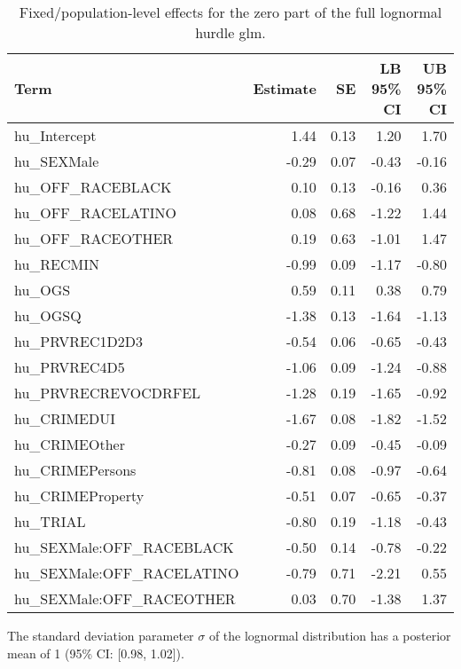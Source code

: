 \documentclass[
  letterpaper,
  DIV=11,
  numbers=noendperiod]{scrartcl}
\begin{document}
\hypertarget{tbl-brms-hurdle-model-summary-2-zero}{}
\begin{table}
\caption{\label{tbl-brms-hurdle-model-summary-2-zero}Fixed/population-level effects for the zero part of the full lognormal
hurdle glm. }\tabularnewline

\centering
\begin{tabular}{l|r|r|r|r}
\hline
Term & Estimate & SE & LB 95\% CI & UB 95\% CI\\
\hline
hu\_Intercept & 1.44 & 0.13 & 1.20 & 1.70\\
\hline
hu\_SEXMale & -0.29 & 0.07 & -0.43 & -0.16\\
\hline
hu\_OFF\_RACEBLACK & 0.10 & 0.13 & -0.16 & 0.36\\
\hline
hu\_OFF\_RACELATINO & 0.08 & 0.68 & -1.22 & 1.44\\
\hline
hu\_OFF\_RACEOTHER & 0.19 & 0.63 & -1.01 & 1.47\\
\hline
hu\_RECMIN & -0.99 & 0.09 & -1.17 & -0.80\\
\hline
hu\_OGS & 0.59 & 0.11 & 0.38 & 0.79\\
\hline
hu\_OGSQ & -1.38 & 0.13 & -1.64 & -1.13\\
\hline
hu\_PRVREC1D2D3 & -0.54 & 0.06 & -0.65 & -0.43\\
\hline
hu\_PRVREC4D5 & -1.06 & 0.09 & -1.24 & -0.88\\
\hline
hu\_PRVRECREVOCDRFEL & -1.28 & 0.19 & -1.65 & -0.92\\
\hline
hu\_CRIMEDUI & -1.67 & 0.08 & -1.82 & -1.52\\
\hline
hu\_CRIMEOther & -0.27 & 0.09 & -0.45 & -0.09\\
\hline
hu\_CRIMEPersons & -0.81 & 0.08 & -0.97 & -0.64\\
\hline
hu\_CRIMEProperty & -0.51 & 0.07 & -0.65 & -0.37\\
\hline
hu\_TRIAL & -0.80 & 0.19 & -1.18 & -0.43\\
\hline
hu\_SEXMale:OFF\_RACEBLACK & -0.50 & 0.14 & -0.78 & -0.22\\
\hline
hu\_SEXMale:OFF\_RACELATINO & -0.79 & 0.71 & -2.21 & 0.55\\
\hline
hu\_SEXMale:OFF\_RACEOTHER & 0.03 & 0.70 & -1.38 & 1.37\\
\hline
\end{tabular}
\end{table}

The standard deviation parameter \(\sigma\) of the lognormal
distribution has a posterior mean of 1 (95\% CI: {[}0.98, 1.02{]}).
\end{document}
